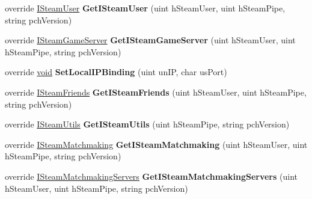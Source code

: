\begin{DoxyCompactItemize}
\item 
\hypertarget{classValve_1_1Steamworks_1_1CSteamClient_a0f9304edbd9859e3446b59c4fe2ad248}{}override \hyperlink{classValve_1_1Steamworks_1_1ISteamUser}{I\+Steam\+User} {\bfseries Get\+I\+Steam\+User} (uint h\+Steam\+User, uint h\+Steam\+Pipe, string pch\+Version)\label{classValve_1_1Steamworks_1_1CSteamClient_a0f9304edbd9859e3446b59c4fe2ad248}

\item 
\hypertarget{classValve_1_1Steamworks_1_1CSteamClient_a388aa1fceee9481445b14b5a7a18bda0}{}override \hyperlink{classValve_1_1Steamworks_1_1ISteamGameServer}{I\+Steam\+Game\+Server} {\bfseries Get\+I\+Steam\+Game\+Server} (uint h\+Steam\+User, uint h\+Steam\+Pipe, string pch\+Version)\label{classValve_1_1Steamworks_1_1CSteamClient_a388aa1fceee9481445b14b5a7a18bda0}

\item 
\hypertarget{classValve_1_1Steamworks_1_1CSteamClient_a636c367a49500dbd397f4d762f68a090}{}override \hyperlink{SDL__audio_8h_a52835ae37c4bb905b903cbaf5d04b05f}{void} {\bfseries Set\+Local\+I\+P\+Binding} (uint un\+I\+P, char us\+Port)\label{classValve_1_1Steamworks_1_1CSteamClient_a636c367a49500dbd397f4d762f68a090}

\item 
\hypertarget{classValve_1_1Steamworks_1_1CSteamClient_ab034d5dba7c18482a604fdfff37f2f43}{}override \hyperlink{classValve_1_1Steamworks_1_1ISteamFriends}{I\+Steam\+Friends} {\bfseries Get\+I\+Steam\+Friends} (uint h\+Steam\+User, uint h\+Steam\+Pipe, string pch\+Version)\label{classValve_1_1Steamworks_1_1CSteamClient_ab034d5dba7c18482a604fdfff37f2f43}

\item 
\hypertarget{classValve_1_1Steamworks_1_1CSteamClient_a729f7d0cb66765407234c2ba680f8ffe}{}override \hyperlink{classValve_1_1Steamworks_1_1ISteamUtils}{I\+Steam\+Utils} {\bfseries Get\+I\+Steam\+Utils} (uint h\+Steam\+Pipe, string pch\+Version)\label{classValve_1_1Steamworks_1_1CSteamClient_a729f7d0cb66765407234c2ba680f8ffe}

\item 
\hypertarget{classValve_1_1Steamworks_1_1CSteamClient_ad7235c8e6223bf547a2ace14032605c6}{}override \hyperlink{classValve_1_1Steamworks_1_1ISteamMatchmaking}{I\+Steam\+Matchmaking} {\bfseries Get\+I\+Steam\+Matchmaking} (uint h\+Steam\+User, uint h\+Steam\+Pipe, string pch\+Version)\label{classValve_1_1Steamworks_1_1CSteamClient_ad7235c8e6223bf547a2ace14032605c6}

\item 
\hypertarget{classValve_1_1Steamworks_1_1CSteamClient_ae04f27fbaed7609d5bd1f4adbb83ed8b}{}override \hyperlink{classValve_1_1Steamworks_1_1ISteamMatchmakingServers}{I\+Steam\+Matchmaking\+Servers} {\bfseries Get\+I\+Steam\+Matchmaking\+Servers} (uint h\+Steam\+User, uint h\+Steam\+Pipe, string pch\+Version)\label{classValve_1_1Steamworks_1_1CSteamClient_ae04f27fbaed7609d5bd1f4adbb83ed8b}


\end{DoxyCompactItemize}
